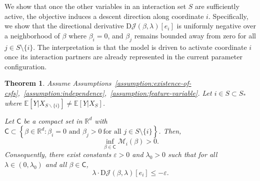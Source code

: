 \documentclass[sn-mathphys-num]{sn-jnl}%
\numberwithin{equation}{section}
\newcommand{\R}{\mathbb{R}}
\newcommand{\E}{\mathbb{E}}
\theoremstyle{thmstyleone}%
\newtheorem{theorem}{Theorem}%
\theoremstyle{thmstyletwo}%
\theoremstyle{thmstylethree}%
\begin{document}
We show that once the other variables in an interaction set $S$ are sufficiently active, the objective induces a descent direction along coordinate $i$. Specifically, we show that the directional derivative $\mathrm{D}\mathcal{J}(\beta, \lambda)[e_i]$ is uniformly negative over a neighborhood of $\beta$ where $\beta_i = 0$, and $\beta_j$ remains bounded away from zero for all $j \in S \setminus \{i\}$. The interpretation is that the model is driven to activate coordinate $i$ once its interaction partners are already represented in the current parameter configuration.

\begin{theorem}
\label{theorem:uniform-lower-bound-on-M-i-beta-interaction}
Assume Assumptions~\ref{assumption:existence-of-csfs},~\ref{assumption:independence},~\ref{assumption:feature-variable}. Let $i \in S \subset S_*$ where $\E[Y|X_{S \backslash \{i\}}] \ne \E[Y|X_S]$.

Let $\mathsf{C}$ be a compact set in $\R^d$ with $\mathsf{C} \subset \left\{ \beta \in \mathbb{R}^d : \beta_i = 0 \text{ and } \beta_j > 0 \ \text{for all } j \in S \setminus \{i\} \right\}$. Then,
	\begin{equation*}
		\inf_{\beta \in \mathsf{C}} \mathcal{M}_i(\beta) > 0.
	\end{equation*}
Consequently, there exist constants $\varepsilon > 0$ and $\lambda_0 > 0$ such that for all $\lambda \in (0, \lambda_0)$ and all $\beta \in \mathsf{C}$,
\begin{equation*}
	\lambda \cdot \mathrm{D}\mathcal{J}(\beta, \lambda)[e_i] \le -\varepsilon.
\end{equation*}
\end{theorem}
\end{document}
